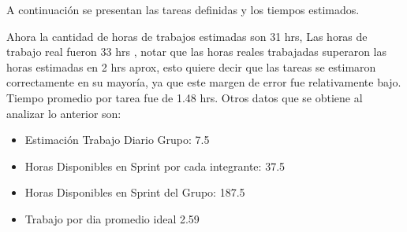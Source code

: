 \documentclass{memoria}
\begin{document}
\newpage

A continuación se presentan las tareas definidas y los tiempos estimados.



Ahora la cantidad de horas de trabajos estimadas son 31 hrs, Las horas de trabajo real fueron 33 hrs , notar que las horas reales trabajadas superaron las horas estimadas en 2 hrs aprox, esto quiere decir que las tareas se estimaron correctamente en su mayoría, ya que este margen de error fue relativamente bajo. Tiempo promedio por tarea fue de 1.48 hrs. Otros datos que se obtiene al analizar lo anterior son:

\begin{itemize}
	\item Estimación Trabajo Diario Grupo: 7.5 
	\item Horas Disponibles en Sprint por cada integrante: 37.5 
	\item Horas Disponibles en Sprint del Grupo: 187.5 
	\item Trabajo por dia promedio ideal 2.59 
\end{itemize}
\end{document}
